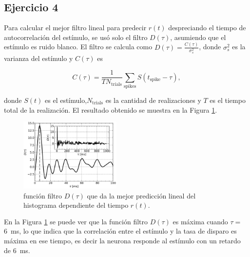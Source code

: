 \documentclass[11pt, twocolumn]{article}
\begin{document}
\subsection*{Ejercicio 4}

Para calcular el mejor filtro lineal para predecir \(r(t)\) despreciando el tiempo de autocorrelación del estímulo, se usó solo el filtro \(D(\tau)\), asumiendo que el estímulo es ruido blanco. El filtro se calcula como \(D(\tau) = \frac{C(\tau)}{\sigma^2_s}\), donde \(\sigma^2_s\) es la varianza del estímulo y \(C(\tau)\) es


\begin{equation}    \nonumber
    C(\tau) = \frac{1}{T N_\text{trials}} \sum_\text{spikes} S(t_\text{spike} - \tau),
\end{equation}

\noindent donde \(S(t)\) es el estímulo,\(N_\text{trials}\) es la cantidad de realizaciones y \(T\) es el tiempo total de la realización. El resultado obtenido se muestra en la Figura \ref{fig:filter}.

\begin{figure} [htbp]
    \centering
    \includegraphics[width=0.45\textwidth]{figures/correlogram.pdf}
    \caption{función filtro \(D(\tau)\) que da la mejor predicción lineal del histograma dependiente del tiempo \(r(t)\).}
    \label{fig:filter}
\end{figure}

En la Figura \ref{fig:filter} se puede ver que la función filtro \(D(\tau)\) es máxima cuando \(\tau =\) \SI{6}{\milli\second}, lo que indica que la correlación entre el estímulo y la tasa de disparo es máxima en ese tiempo, es decir la neurona responde al estímulo con un retardo de \SI{6}{\milli\second}.
\end{document}

